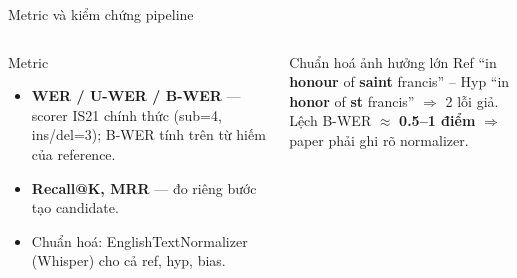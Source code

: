 \documentclass[aspectratio=169,xcolor=table]{beamer}
\newcommand{\bad}[1]{\textcolor{RiskRed}{\textbf{#1}}}
\newcommand{\cmark}{\textcolor{GoodGreen}{\ding{51}}}
\begin{document}
\begin{frame}{Metric và kiểm chứng pipeline}
\begin{columns}[T,onlytextwidth]
\begin{block}{Metric}
\small
\begin{itemize}\itemsep3pt
\item \textbf{WER / U-WER / B-WER} --- scorer IS21 chính thức (sub=4, ins/del=3); B-WER tính trên từ hiếm của reference.
\item \textbf{Recall@K, MRR} --- đo riêng bước tạo candidate.
\item Chuẩn hoá: EnglishTextNormalizer (Whisper) cho cả ref, hyp, bias.
\end{itemize}
\end{block}
\begin{alertblock}{Chuẩn hoá ảnh hưởng lớn}
\small Ref ``in \textbf{honour} of \textbf{saint} francis'' -- Hyp ``in \textbf{honor} of \textbf{st} francis'' $\Rightarrow$ 2 lỗi giả.\\[2pt]
Lệch B-WER $\approx$ \bad{0.5--1 điểm} $\Rightarrow$ paper phải ghi rõ normalizer.
\end{alertblock}
\end{columns}
\vspace{0.25cm}
\begin{center}
\end{center}
\end{frame}

\end{document}
